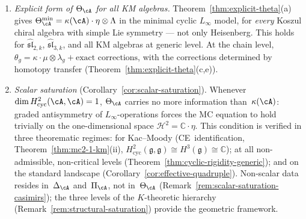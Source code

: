 \begin{enumerate}[label=\textup{(\roman*)}]
\item \emph{Explicit form of $\Theta_{\cA}$ for all KM algebras.}
  Theorem~\ref{thm:explicit-theta}(a) gives
  $\Theta_{\cA}^{\min} = \kappa(\cA) \cdot \eta \otimes \Lambda$
  in the minimal cyclic $L_\infty$ model, for \emph{every} Koszul
  chiral algebra with simple Lie symmetry --- not only Heisenberg.
  This holds for $\widehat{\mathfrak{sl}}_{2,k}$,
  $\widehat{\mathfrak{sl}}_{3,k}$, and all KM algebras at generic
  level.  At the chain level, $\theta_g = \kappa \cdot \mu \otimes
  \lambda_g + \text{exact corrections}$, with the corrections
  determined by homotopy transfer
  (Theorem~\ref{thm:explicit-theta}(c,e)).
\item \emph{Scalar saturation}
  (Corollary~\ref{cor:scalar-saturation}).
  Whenever $\dim H^2_{\mathrm{cyc}}(\cA,\cA) = 1$,
  $\Theta_{\cA}$ carries no more information than~$\kappa(\cA)$:
  graded antisymmetry of $L_\infty$-operations forces the MC
  equation to hold trivially on the one-dimensional space
  $\mathcal{H}^2 = \mathbb{C}\!\cdot\!\eta$.
  This condition is verified in three theorematic regimes: for Kac--Moody
  (CE~identification, Theorem~\ref{thm:mc2-1-km}(ii),
  $H^2_{\mathrm{cyc}}(\mathfrak{g},\mathfrak{g}) \cong
  H^3(\mathfrak{g}) \cong \mathbb{C}$);
  at all non-admissible, non-critical levels
  (Theorem~\ref{thm:cyclic-rigidity-generic});
  and on the standard landscape
  (Corollary~\ref{cor:effective-quadruple}).
  Non-scalar data resides in~$\Delta_{\cA}$
  and~$\Pi_{\cA}$, not in~$\Theta_{\cA}$
  (Remark~\ref{rem:scalar-saturation-casimirs}); the three
  levels of the $K$-theoretic hierarchy
  (Remark~\ref{rem:structural-saturation}) provide the
  geometric framework.
\end{enumerate}

